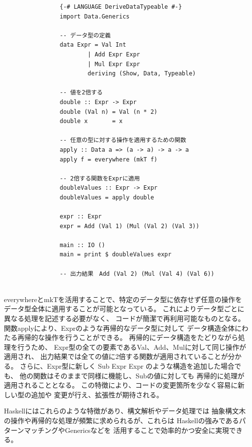 \documentclass{cssspaper}
\begin{document}
            \begin{lstlisting}
                {-# LANGUAGE DeriveDataTypeable #-}
                import Data.Generics

                -- データ型の定義
                data Expr = Val Int
                        | Add Expr Expr
                        | Mul Expr Expr
                        deriving (Show, Data, Typeable)

                -- 値を2倍する
                double :: Expr -> Expr
                double (Val n) = Val (n * 2)
                double x       = x

                -- 任意の型に対する操作を適用するための関数
                apply :: Data a => (a -> a) -> a -> a
                apply f = everywhere (mkT f)

                -- 2倍する関数をExprに適用
                doubleValues :: Expr -> Expr
                doubleValues = apply double

                expr :: Expr
                expr = Add (Val 1) (Mul (Val 2) (Val 3))

                main :: IO ()
                main = print $ doubleValues expr

                -- 出力結果　Add (Val 2) (Mul (Val 4) (Val 6))
                                                
            \end{lstlisting}

            everywhereとmkTを活用することで、特定のデータ型に依存せず任意の操作を
            データ型全体に適用することが可能となっている。
            これによりデータ型ごとに異なる処理を記述する必要がなく、
            コードが簡潔で再利用可能なものとなる。
            関数applyにより、Exprのような再帰的なデータ型に対して
            データ構造全体にわたる再帰的な操作を行うことができる。
            再帰的にデータ構造をたどりながら処理を行うため、
            Expr型の全ての要素であるVal、Add、Mulに対して同じ操作が適用され、
            出力結果では全ての値に2倍する関数が適用されていることが分かる。
            さらに、Expr型に新しく Sub Expr Expr のような構造を追加した場合でも、
            他の関数はそのままで同様に機能し、Subの値に対しても
            再帰的に処理が適用されることとなる。
            この特徴により、コードの変更箇所を少なく容易に新しい型の追加や
            変更が行え、拡張性が期待される。
            
        Haskellにはこれらのような特徴があり、構文解析やデータ処理では
        抽象構文木の操作や再帰的な処理が頻繁に求められるが、これらは
        Haskellの強みであるパターンマッチングやGenericsなどを
        活用することで効率的かつ安全に実現できる。
\end{document}
